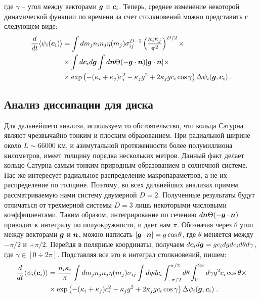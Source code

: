 где $\gamma$ -- угол между векторами $\bm{g}$ и $\bm{c}_i$. Теперь, среднее изменение некоторой динамической функции по времени
за счет столкновений можно представить с следующем виде:
\begin{equation}
  \begin{split}
    \frac{d}{dt}\langle\psi_i(\bm{c}_i)\rangle &= \int dm_jn_in_j\eta(m_j)
    \sigma^{D-1}_{ij}\left(\frac{\kappa_i\kappa_j}{\pi^2}\right)^{D/2}\times\\
    &\times\int d\bm{c}_id\bm{g}\int d\bm{n}\Theta(-\bm{g}\cdot\bm{n})\vert\bm{g}\cdot\bm{n}\vert\times\\
    &\times\exp\left(-(\kappa_i+\kappa_j)c^2_i-\kappa_jg^2+2\kappa_jgc_i\cos\gamma\right)\Delta\psi_i(\bm{g},\bm{c}_i)\;.
  \end{split}
\end{equation}


\subsection{Анализ диссипации для диска}
Для дальнейшего анализа, используем то обстоятельство, что кольца Сатурна являют чрезвычайно тонким и плоским образованием.
При радиальной ширине около $L\sim 66 000$ км, и азимутальной протяженности более полумиллиона километров, имеет толщину 
порядка нескольких метров. Данный факт делает кольцо Сатурна самым тонким природным образованием в солнечной системе. 
Нас же интересует радиальное распределение макропараметров, а не их распределение по толщине. Поэтому, во всех дальнейших
анализах примем рассматриваемую нами систему двумерной $D=2$. Полученные результаты будут отличаться от трехмерной системы
$D=3$ лишь некоторыми числовыми коэффициентами. Таким образом, интегрирование по сечению $d\bm{n}\Theta(-\bm{g}\cdot\bm{n})$ приводит
к интегралу по полуокружности, и дает нам $\pi$. Обозначая через $\theta$ угол между векторами $\bm{g}$ и $\bm{n}$, можно написать
$\vert\bm{g}\cdot\bm{n}\vert=g\cos\theta$, где $\theta$ меняется между $-\pi/2$ и $+\pi/2$. Перейдя в полярные координаты, получаем
$d\bm{c}_id\bm{g}=gc_i dg dc_id\theta d\gamma$, где $\gamma\in[0\div 2\pi]$. Подставляя все это в интеграл столкновений, пишем:
\begin{equation}
  \begin{split}
    \frac{d}{dt}\langle\psi_i(\bm{c}_i)\rangle &=\frac{n_i\kappa_i}{\pi}\int dm_jn_j\kappa_j\eta(m_j)\sigma_{ij}
    \int dgdc_i\int_{-\pi/2}^{\pi/2}d\theta\int_0^{2\pi}d\gamma g^2c_i\cos\theta\times \\
    &\times\exp\left(-(\kappa_i+\kappa_j)c^2_i-\kappa_jg^2+2\kappa_jgc_i\cos\gamma\right)\Delta\psi_i(\bm{g},\bm{c}_i)\;.
  \end{split}
\end{equation}
